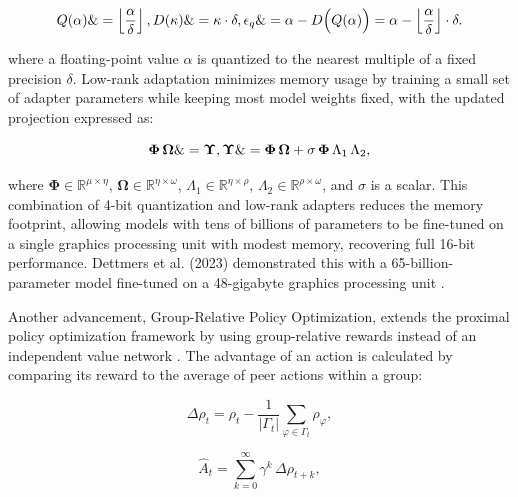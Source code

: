 \documentclass{svproc}
\begin{document}
\begin{equation}
  Q(\alpha) \&= \left\lfloor \frac{\alpha}{\delta} \right\rfloor,\\
  D(\kappa) \&= \kappa \cdot \delta, \\
  \epsilon_{q} \&= \alpha - D\Bigl(Q(\alpha)\Bigr) = \alpha - \left\lfloor \frac{\alpha}{\delta} \right\rfloor \cdot \delta.
\end{equation}

\noindent where a floating-point value \(\alpha\) is quantized to the nearest multiple of a fixed precision \(\delta\). Low-rank adaptation minimizes memory usage by training a small set of adapter parameters while keeping most model weights fixed, with the updated projection expressed as:


\begin{equation}
  \boldsymbol{\Phi}\,\boldsymbol{\Omega} \&= \boldsymbol{\Upsilon}, \\
  \boldsymbol{\Upsilon} \&= \boldsymbol{\Phi}\,\boldsymbol{\Omega} + \sigma\,\boldsymbol{\Phi}\,\Lambda_1\,\Lambda_2,
\end{equation}

\noindent where \(\boldsymbol{\Phi} \in \mathbb{R}^{\mu \times \eta}\), \(\boldsymbol{\Omega} \in \mathbb{R}^{\eta \times \omega}\), \(\Lambda_1 \in \mathbb{R}^{\eta \times \rho}\), \(\Lambda_2 \in \mathbb{R}^{\rho \times \omega}\), and \(\sigma\) is a scalar. This combination of 4-bit quantization and low-rank adapters reduces the memory footprint, allowing models with tens of billions of parameters to be fine-tuned on a single graphics processing unit with modest memory, recovering full 16-bit performance. Dettmers et al. (2023) demonstrated this with a 65-billion-parameter model fine-tuned on a 48-gigabyte graphics processing unit \cite{dettmers2023qloraefficientfinetuningquantized}.

Another advancement, Group-Relative Policy Optimization, extends the proximal policy optimization framework by using group-relative rewards instead of an independent value network \cite{schulman2017proximalpolicyoptimizationalgorithms}. The advantage of an action is calculated by comparing its reward to the average of peer actions within a group:


\begin{equation}
  \Delta \rho_t = \rho_t - \frac{1}{|\Gamma_t|} \sum_{\varphi \in \Gamma_t} \rho_\varphi,
\end{equation}

\begin{equation}
  \hat{A}_t = \sum_{k=0}^{\infty} \gamma^k\, \Delta \rho_{t+k},
\end{equation}
\end{document}
